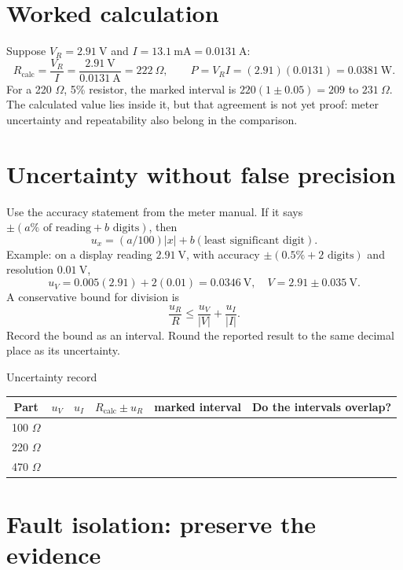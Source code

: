 \section{Worked calculation}

Suppose \(V_R=2.91\ \mathrm{V}\) and \(I=13.1\ \mathrm{mA}
=0.0131\ \mathrm{A}\):
\[
R_\text{calc}=\frac{V_R}{I}
=\frac{2.91\ \mathrm{V}}{0.0131\ \mathrm{A}}
=222\ \Omega ,
\qquad
P=V_RI=(2.91)(0.0131)=0.0381\ \mathrm{W}.
\]
For a 220 \(\Omega\), 5\% resistor, the marked interval is
\(220(1\pm0.05)=209\) to \(231\ \Omega\). The calculated value lies inside it,
but that agreement is not yet proof: meter uncertainty and repeatability also
belong in the comparison.

\section{Uncertainty without false precision}

Use the accuracy statement from the meter manual. If it says
\(\pm(a\%\text{ of reading}+b\text{ digits})\), then
\[
u_x=(a/100)|x|+b(\text{least significant digit}).
\]
Example: on a display reading \(2.91\ \mathrm{V}\), with accuracy
\(\pm(0.5\%+2\text{ digits})\) and resolution \(0.01\ \mathrm{V}\),
\[
u_V=0.005(2.91)+2(0.01)=0.0346\ \mathrm{V},
\quad V=2.91\pm0.035\ \mathrm{V}.
\]
A conservative bound for division is
\[
\frac{u_R}{R}\leq\frac{u_V}{|V|}+\frac{u_I}{|I|}.
\]
Record the bound as an interval. Round the reported result to the same decimal
place as its uncertainty.

\begin{teloscard}{Uncertainty record}
\begin{tabularx}{\linewidth}{@{}c c c c c L@{}}
\toprule
Part & \(u_V\) & \(u_I\) & \(R_\text{calc}\pm u_R\) &
marked interval & Do the intervals overlap?\\
 \(\Omega\) & & & & & \\[1.7em]
220 \(\Omega\) & & & & & \\[1.7em]
470 \(\Omega\) & & & & & \\
\bottomrule
\end{tabularx}
\end{teloscard}

\section{Fault isolation: preserve the evidence}


